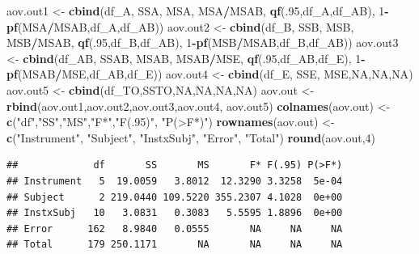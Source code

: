 \documentclass[
]{book}
\newenvironment{Shaded}{\begin{snugshade}}{\end{snugshade}}
\newcommand{\ConstantTok}[1]{\textcolor[rgb]{0.56,0.35,0.01}{#1}}
\newcommand{\DecValTok}[1]{\textcolor[rgb]{0.00,0.00,0.81}{#1}}
\newcommand{\FunctionTok}[1]{\textcolor[rgb]{0.13,0.29,0.53}{\textbf{#1}}}
\newcommand{\NormalTok}[1]{#1}
\newcommand{\OtherTok}[1]{\textcolor[rgb]{0.56,0.35,0.01}{#1}}
\newcommand{\SpecialCharTok}[1]{\textcolor[rgb]{0.81,0.36,0.00}{\textbf{#1}}}
\newcommand{\StringTok}[1]{\textcolor[rgb]{0.31,0.60,0.02}{#1}}
\begin{document}
\begin{Shaded}
\begin{Highlighting}[]
\NormalTok{aov.out1 }\OtherTok{\textless{}{-}} \FunctionTok{cbind}\NormalTok{(df\_A, SSA, MSA, MSA}\SpecialCharTok{/}\NormalTok{MSAB, }\FunctionTok{qf}\NormalTok{(.}\DecValTok{95}\NormalTok{,df\_A,df\_AB),}
                  \DecValTok{1}\SpecialCharTok{{-}}\FunctionTok{pf}\NormalTok{(MSA}\SpecialCharTok{/}\NormalTok{MSAB,df\_A,df\_AB))}
\NormalTok{aov.out2 }\OtherTok{\textless{}{-}} \FunctionTok{cbind}\NormalTok{(df\_B, SSB, MSB, MSB}\SpecialCharTok{/}\NormalTok{MSAB, }\FunctionTok{qf}\NormalTok{(.}\DecValTok{95}\NormalTok{,df\_B,df\_AB),}
                  \DecValTok{1}\SpecialCharTok{{-}}\FunctionTok{pf}\NormalTok{(MSB}\SpecialCharTok{/}\NormalTok{MSAB,df\_B,df\_AB))}
\NormalTok{aov.out3 }\OtherTok{\textless{}{-}} \FunctionTok{cbind}\NormalTok{(df\_AB, SSAB, MSAB, MSAB}\SpecialCharTok{/}\NormalTok{MSE, }\FunctionTok{qf}\NormalTok{(.}\DecValTok{95}\NormalTok{,df\_AB,df\_E),}
                  \DecValTok{1}\SpecialCharTok{{-}}\FunctionTok{pf}\NormalTok{(MSAB}\SpecialCharTok{/}\NormalTok{MSE,df\_AB,df\_E))}
\NormalTok{aov.out4 }\OtherTok{\textless{}{-}} \FunctionTok{cbind}\NormalTok{(df\_E, SSE, MSE,}\ConstantTok{NA}\NormalTok{,}\ConstantTok{NA}\NormalTok{,}\ConstantTok{NA}\NormalTok{)}
\NormalTok{aov.out5 }\OtherTok{\textless{}{-}} \FunctionTok{cbind}\NormalTok{(df\_TO,SSTO,}\ConstantTok{NA}\NormalTok{,}\ConstantTok{NA}\NormalTok{,}\ConstantTok{NA}\NormalTok{,}\ConstantTok{NA}\NormalTok{)}
\NormalTok{aov.out }\OtherTok{\textless{}{-}} \FunctionTok{rbind}\NormalTok{(aov.out1,aov.out2,aov.out3,aov.out4, aov.out5)}
\FunctionTok{colnames}\NormalTok{(aov.out) }\OtherTok{\textless{}{-}} \FunctionTok{c}\NormalTok{(}\StringTok{"df"}\NormalTok{,}\StringTok{"SS"}\NormalTok{,}\StringTok{"MS"}\NormalTok{,}\StringTok{"F*"}\NormalTok{,}\StringTok{"F(.95)"}\NormalTok{, }\StringTok{"P(\textgreater{}F*)"}\NormalTok{)}
\FunctionTok{rownames}\NormalTok{(aov.out) }\OtherTok{\textless{}{-}} \FunctionTok{c}\NormalTok{(}\StringTok{"Instrument"}\NormalTok{, }\StringTok{"Subject"}\NormalTok{, }\StringTok{"InstxSubj"}\NormalTok{, }\StringTok{"Error"}\NormalTok{, }\StringTok{"Total"}\NormalTok{)}
\FunctionTok{round}\NormalTok{(aov.out,}\DecValTok{4}\NormalTok{)}
\end{Highlighting}
\end{Shaded}

\begin{verbatim}
##             df       SS       MS       F* F(.95) P(>F*)
## Instrument   5  19.0059   3.8012  12.3290 3.3258  5e-04
## Subject      2 219.0440 109.5220 355.2307 4.1028  0e+00
## InstxSubj   10   3.0831   0.3083   5.5595 1.8896  0e+00
## Error      162   8.9840   0.0555       NA     NA     NA
## Total      179 250.1171       NA       NA     NA     NA
\end{verbatim}
\end{document}
